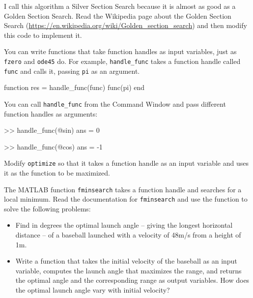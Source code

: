 \documentclass[
]{book}
\numberwithin{Answer}{chapter}
\numberwithin{Exercise}{chapter}
\begin{document}
\begin{ex}
I call this algorithm a Silver Section Search because it is almost as
good as a Golden Section Search.  Read the Wikipedia page about the
Golden Section Search
(\url{https://en.wikipedia.org/wiki/Golden_section_search}) and then
modify this code to implement it.
\end{ex}

\begin{ex}
You can write functions that take function handles as input
variables, just as {\tt fzero} and {\tt ode45} do.
For example, {\tt handle\_func} takes a function handle called
{\tt func} and calls it, passing {\tt pi} as an argument.

\begin{code}
function res = handle_func(func)
    func(pi)
end
\end{code}

You can call {\tt handle\_func} from the Command Window and pass
different function handles as arguments:

\begin{code}
>> handle_func(@sin)
ans = 0

>> handle_func(@cos)
ans = -1
\end{code}

Modify {\tt optimize} so that it takes a function handle
as an input variable and uses it as the function to be
maximized.
\end{ex}


\begin{ex}
The MATLAB function {\tt fminsearch} takes a function handle
and searches for a local minimum.  Read the documentation for
{\tt fminsearch} and use the function to solve the following problems:

\begin{itemize}

\item Find in degrees the optimal launch angle -- giving the longest horizontal distance --
of a baseball launched with a velocity of 48m/s from a height of 1m.

\item Write a function that takes the initial velocity of the baseball
as an input variable, computes the launch angle that maximizes
the range, and returns the optimal angle and the corresponding range as output variables.
How does the optimal launch angle vary with initial velocity?

\end{itemize}
\end{ex}
\end{document}
